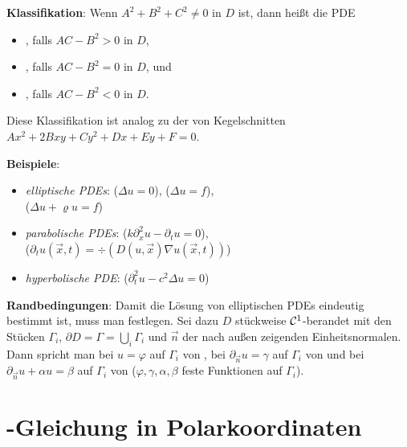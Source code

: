 \textbf{Klassifikation}:
Wenn $A^2 + B^2 + C^2 \not= 0$ in $D$ ist, dann heißt die PDE
\begin{itemize}
    \item
    , falls $AC - B^2 > 0$ in $D$,

    \item
    , falls $AC - B^2 = 0$ in $D$, und

    \item
    , falls $AC - B^2 < 0$ in $D$.
\end{itemize}
Diese Klassifikation ist analog zu der von Kegelschnitten $Ax^2 + 2Bxy + Cy^2 + Dx + Ey + F = 0$.

\textbf{Beispiele}:
\begin{itemize}
    \item
    \emph{elliptische PDEs}:
    ($\Delta u = 0$),
    ($\Delta u = f$),\\
    ($\Delta u + \varrho u = f$)

    \item
    \emph{parabolische PDEs}:
    ($k \partial_x^2 u - \partial_t u = 0$),\\
    ($\partial_t u(\vec{x}, t) = \div(D(u, \vec{x}) \nabla u(\vec{x}, t))$)

    \item
    \emph{hyperbolische PDE}:
    ($\partial_t^2 u - c^2 \Delta u = 0$)
\end{itemize}

\linie

\textbf{Randbedingungen}:
Damit die Lösung von elliptischen PDEs eindeutig bestimmt ist, muss man
 festlegen.
Sei dazu $D$ stückweise $\mathcal{C}^1$-berandet mit den Stücken $\Gamma_i$,
$\partial D = \Gamma = \bigcup_i \Gamma_i$ und $\vec{n}$ der nach außen zeigenden
Einheitsnormalen.
Dann spricht man bei $u = \varphi$ auf $\Gamma_i$ von ,
bei $\partial_{\vec{n}} u = \gamma$ auf $\Gamma_i$ von  und
bei $\partial_{\vec{n}} u + \alpha u = \beta$ auf $\Gamma_i$ von 
($\varphi, \gamma, \alpha, \beta$ feste Funktionen auf $\Gamma_i$).

\pagebreak

\section{%
    -Gleichung in Polarkoordinaten%
}

